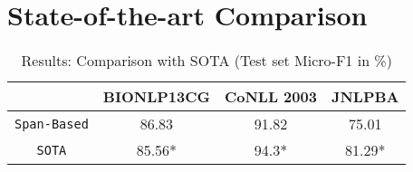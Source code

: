 \section{State-of-the-art Comparison}
\label{sec:sota_comparison}

\begin{table}[h!]
\centering
\begin{tabular}{|c|c|c|c|}\hline
	\textbf{} & \textbf{BIONLP13CG} & \textbf{CoNLL 2003} & \textbf{JNLPBA}\\\hline
	\texttt{Span-Based} & 86.83 & 91.82 & 75.01\\\hline
	\texttt{SOTA} & 85.56* & 94.3* & 81.29*\\\hline
	\end{tabular}
    \caption{Results: Comparison with SOTA (Test set Micro-F1 in \%)}
    \label{tab:context_bio_dataset}
\end{table}